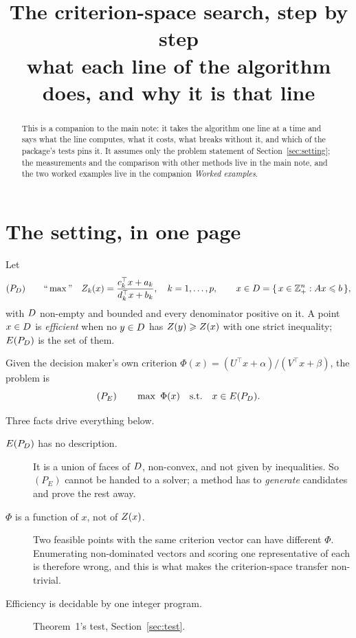 \documentclass[11pt,a4paper]{article}
\title{The criterion-space search, step by step\\
\large what each line of the algorithm does, and why it is that line}
\author{}
\date{}
\begin{document}
\maketitle

\begin{abstract}
This is a companion to the main note: it takes the algorithm one line at a
time and says what the line computes, what it costs, what breaks without it,
and which of the package's tests pins it.  It assumes only the problem
statement of Section~\ref{sec:setting}; the measurements and the comparison
with other methods live in the main note, and the two worked examples live in
the companion \emph{Worked examples}.
\end{abstract}

\tableofcontents

\section{The setting, in one page}\label{sec:setting}

Let
\begin{equation}\label{eq:pd}
  (P_{D}) \qquad \text{``}\max\text{''} \quad
  Z_k(x) = \frac{c_k^{\top}x + a_k}{d_k^{\top}x + b_k},
  \quad k = 1,\dots,p,
  \qquad x \in D = \{\, x \in \mathbb{Z}^n_+ : Ax \leqslant b \,\},
\end{equation}
with $D$ non-empty and bounded and every denominator positive on it.  A
point $x \in D$ is \emph{efficient} when no $y \in D$ has
$Z(y) \geqslant Z(x)$ with one strict inequality; $E(P_{D})$ is the set of them.

Given the decision maker's own criterion
$\Phi(x) = (U^{\top}x + \alpha)/(V^{\top}x + \beta)$, the problem is
\begin{equation}\label{eq:pe}
  (P_E) \qquad \max \ \Phi(x) \quad \text{s.t.} \quad x \in E(P_{D}) .
\end{equation}

Three facts drive everything below.

\begin{description}
\item[$E(P_{D})$ has no description.] It is a union of faces of $D$, non-convex,
  and not given by inequalities.  So $(P_E)$ cannot be handed to a solver; a
  method has to \emph{generate} candidates and prove the rest away.
\item[$\Phi$ is a function of $x$, not of $Z(x)$.] Two feasible points with
  the same criterion vector can have different $\Phi$.  Enumerating
  non-dominated vectors and scoring one representative of each is therefore
  wrong, and this is what makes the criterion-space transfer non-trivial.
\item[Efficiency is decidable by one integer program.]  Theorem~1's test,
  Section~\ref{sec:test}.
\end{description}
\end{document}
